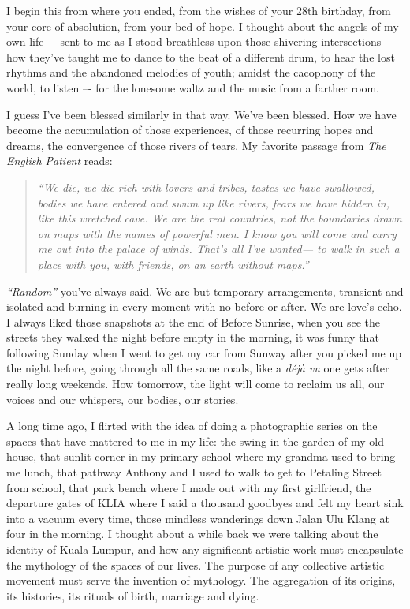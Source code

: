 \documentclass[11pt]{letter}
\begin{document}
I begin this from where you ended, from the wishes of your 28th birthday, from
your core of absolution, from your bed of hope. I thought about the angels of my
own life –- sent to me as I stood breathless upon those shivering intersections
–- how they’ve taught me to dance to the beat of a different drum, to hear the
lost rhythms and the abandoned melodies of youth; amidst the cacophony of the
world, to listen –- for the lonesome waltz and the music from a farther room.

I guess I’ve been blessed similarly in that way. We’ve been blessed. How we have
become the accumulation of those experiences, of those recurring hopes and
dreams, the convergence of those rivers of tears. My favorite passage from \emph{The
English Patient} reads:
\begin{quotation}
	\emph{“We die, we die rich with lovers and tribes, tastes we
	have swallowed, bodies we have entered and swum up like rivers, fears we have
	hidden in, like this wretched cave. We are the real countries, not the
	boundaries drawn on maps with the names of powerful men. I know you will come
	and carry me out into the palace of winds. That's all I've wanted— to walk in
	such a place with you, with friends, on an earth without maps.”}
\end{quotation}

\emph{“Random”} you’ve always said. We are but temporary arrangements, transient and
isolated and burning in every moment with no before or after. We are love’s
echo. I always liked those snapshots at the end of Before Sunrise, when you see
the streets they walked the night before empty in the morning, it was funny that
following Sunday when I went to get my car from Sunway after you picked me up
the night before, going through all the same roads, like a \emph{déjà vu} one gets
after really long weekends. How tomorrow, the light will come to reclaim us all,
our voices and our whispers, our bodies, our stories.

A long time ago, I flirted with the idea of doing a photographic series on the
spaces that have mattered to me in my life: the swing in the garden of my old
house, that sunlit corner in my primary school where my grandma used to bring me
lunch, that pathway Anthony and I used to walk to get to Petaling Street from
school, that park bench where I made out with my first girlfriend, the departure
gates of KLIA where I said a thousand goodbyes and felt my heart sink into a
vacuum every time, those mindless wanderings down Jalan Ulu Klang at four in the
morning. I thought about a while back we were talking about the identity of
Kuala Lumpur, and how any significant artistic work must encapsulate the
mythology of the spaces of our lives. The purpose of any collective artistic
movement must serve the invention of mythology. The aggregation of its origins,
its histories, its rituals of birth, marriage and dying.
\end{document}

